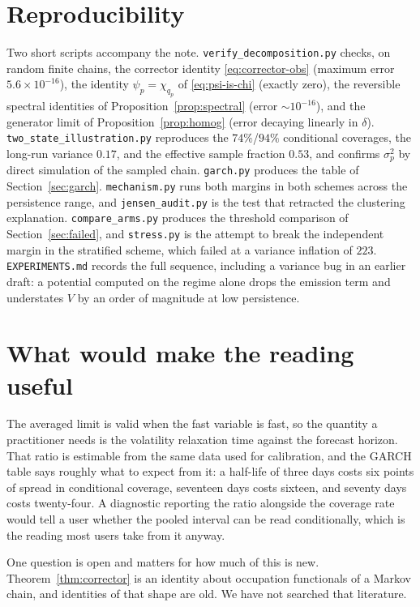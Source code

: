 \documentclass[11pt]{article}
\theoremstyle{definition}
\theoremstyle{remark}
\begin{document}
\section{Reproducibility}\label{sec:repro}

Two short scripts accompany the note. \texttt{verify\_decomposition.py} checks, on random
finite chains, the corrector identity \eqref{eq:corrector-obs} (maximum error $5.6\times
10^{-16}$), the identity $\psi_p=\chi_{q_p}$ of \eqref{eq:psi-is-chi} (exactly zero), the
reversible spectral identities of Proposition~\ref{prop:spectral} (error $\sim10^{-16}$), and
the generator limit of Proposition~\ref{prop:homog} (error decaying linearly in $\delta$).
\texttt{two\_state\_illustration.py} reproduces the $74\%$/$94\%$ conditional coverages, the
long-run variance $0.17$, and the effective sample fraction $0.53$, and confirms $\sigma_p^2$
by direct simulation of the sampled chain. \texttt{garch.py} produces the table of Section~\ref{sec:garch}.
\texttt{mechanism.py} runs both margins in both schemes across the persistence range, and
\texttt{jensen\_audit.py} is the test that retracted the clustering explanation.
\texttt{compare\_arms.py} produces the threshold comparison of Section~\ref{sec:failed}, and
\texttt{stress.py} is the attempt to break the independent margin in the stratified scheme, which
failed at a variance inflation of $223$. \texttt{EXPERIMENTS.md} records the full sequence,
including a variance bug in an earlier draft: a potential computed on the regime alone drops the
emission term and understates $V$ by an order of magnitude at low persistence.

\section{What would make the reading useful}

The averaged limit is valid when the fast variable is fast, so the quantity a practitioner needs is
the volatility relaxation time against the forecast horizon. That ratio is estimable from the same
data used for calibration, and the GARCH table says roughly what to expect from it: a half-life of
three days costs six points of spread in conditional coverage, seventeen days costs sixteen, and
seventy days costs twenty-four. A diagnostic reporting the ratio alongside the coverage rate would
tell a user whether the pooled interval can be read conditionally, which is the reading most users
take from it anyway.

One question is open and matters for how much of this is new. Theorem~\ref{thm:corrector} is an
identity about occupation functionals of a Markov chain, and identities of that shape are old. We
have not searched that literature.
\end{document}
